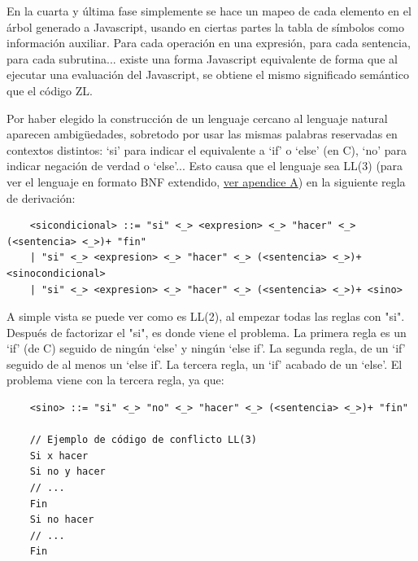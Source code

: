 \documentclass{report}
\begin{document}
	\vspace{10px}
	
	En la cuarta y última fase simplemente se hace un mapeo de cada elemento en el árbol generado a Javascript, usando en ciertas partes la tabla de símbolos como información auxiliar. Para cada operación en una expresión, para cada sentencia, para cada subrutina... existe una forma Javascript equivalente de forma que al ejecutar una evaluación del Javascript, se obtiene el mismo significado semántico que el código ZL. 
	
	
	
	Por haber elegido la construcción de un lenguaje cercano al lenguaje natural aparecen ambigüedades, sobretodo por usar las mismas palabras reservadas en contextos distintos: `si' para indicar el equivalente a `if' o `else' (en C), `no' para indicar negación de verdad o `else'... Esto causa que el lenguaje sea LL(3) (para ver el lenguaje en formato BNF extendido, \hyperref[app:a]{ver apendice A}) en la siguiente regla de derivación:
	
	\vspace{10px}
	
	
	\begin{verbatim}
	<sicondicional> ::= "si" <_> <expresion> <_> "hacer" <_> (<sentencia> <_>)+ "fin"
	| "si" <_> <expresion> <_> "hacer" <_> (<sentencia> <_>)+ <sinocondicional>
	| "si" <_> <expresion> <_> "hacer" <_> (<sentencia> <_>)+ <sino>
	\end{verbatim}
	
	A simple vista se puede ver como es LL(2), al empezar todas las reglas con "si". Después de factorizar el "si", es donde viene el problema. La primera regla es un `if' (de C) seguido de ningún `else' y ningún `else if'. La segunda regla, de un `if' seguido de al menos un `else if'. La tercera regla, un `if' acabado de un `else'. El problema viene con la tercera regla, ya que:
	
	\vspace{10px}
	
	\begin{BVerbatim}
	<sino> ::= "si" <_> "no" <_> "hacer" <_> (<sentencia> <_>)+ "fin"
	
	// Ejemplo de código de conflicto LL(3)
	Si x hacer
	Si no y hacer
	// ...
	Fin
	Si no hacer
	// ...
	Fin
	\end{BVerbatim}
	
\end{document}
